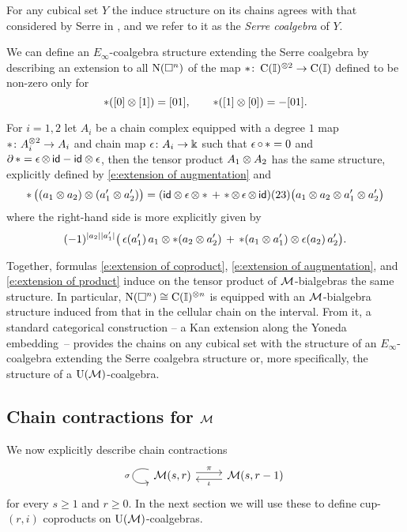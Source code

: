 For any cubical set $Y$ the induce structure on its chains agrees with that considered by Serre in \cite{serre1951homologie}, and we refer to it as the \textit{Serre coalgebra} of $Y$.

We can define an $E_\infty$-coalgebra structure extending the Serre coalgebra by describing an extension to all $\operatorname{N}(\square^n)$ of the map $\ast \colon \operatorname{C}(\mathbb{I})^{\otimes 2} \to \operatorname{C}(\mathbb{I})$ defined to be non-zero only for
\[
\ast([0] \otimes [1]) = [01], \qquad
\ast([1] \otimes [0]) = - [01].
\]

For $i = 1,2$ let $A_i$ be a chain complex equipped with a degree $1$ map $\operatorname{\ast} \colon A_i^{\otimes 2} \to A_i$ and chain map $\operatorname{\epsilon} \colon A_i \to \Bbbk$ such that $\operatorname{\epsilon} \circ \operatorname{\ast} = 0$ and $\partial \operatorname{\ast} = \operatorname{\epsilon} \otimes \, \mathsf{id} - \mathsf{id} \otimes \operatorname{\epsilon}$, then the tensor product $A_1 \otimes A_2$ has the same structure, explicitly defined by \eqref{e:extension of augmentation} and
\begin{equation} \label{e:extension of product}
\operatorname{\ast} \big( (a_1 \otimes a_2) \otimes (a_1^\prime \otimes a_2^\prime)\big) =
(\mathsf{id} \otimes \operatorname{\epsilon} \otimes \ast \, + \, \operatorname{\ast} \otimes \operatorname{\epsilon} \otimes \, \mathsf{id})(23)
\big( a_1 \otimes a_2 \otimes a_1^\prime \otimes a_2^\prime \big)
\end{equation}
where the right-hand side is more explicitly given by
\[
(-1)^{\lvert a_2\rvert \lvert a_1^\prime\rvert} \big( \operatorname{\epsilon}(a_1^\prime) \, a_1 \otimes \ast (a_2 \otimes a_2^\prime)  \, + \, \operatorname{\ast}(a_1 \otimes a_1^\prime) \otimes \operatorname{\epsilon}(a_2) \, a_2^\prime \big).
\]

Together, formulas \eqref{e:extension of coproduct}, \eqref{e:extension of augmentation}, and \eqref{e:extension of product} induce on the tensor product of $\mathcal{M}$-bialgebras the same structure.
In particular, $\operatorname{N}(\square^n) \cong \operatorname{C}(\mathbb{I})^{\otimes n}$ is equipped with an $\mathcal{M}$-bialgebra structure induced from that in the cellular chain on the interval.
From it, a standard categorical construction -- a Kan extension along the Yoneda embedding~-- provides the chains on any cubical set with the structure of an $E_\infty$-coalgebra extending the Serre coalgebra structure or, more specifically, the structure of a ${\operatorname{U}(\mathcal{M})}$-coalgebra.

\subsection{Chain contractions for $\mathcal{M}$} \label{ss:homology of M}

We now explicitly describe chain contractions
\[
\begin{tikzcd}
\arrow[loop, distance=2em, in=195, out=165, "\sigma"'] \M(s,r) \arrow[r, shift left=3pt, "\proj"] &
\M(s,r-1) \arrow[l, shift left=3pt, "\incl"]
\end{tikzcd}
\]
for every $s \geq 1$ and $r \geq 0$.
In the next section we will use these to define cup-$(r, i)$ coproducts on ${\operatorname{U}(\mathcal{M})}$-coalgebras.

